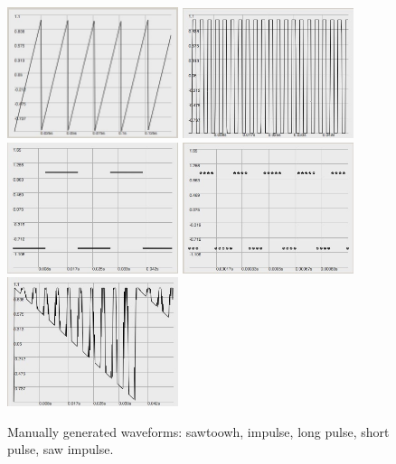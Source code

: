 \documentclass[letterpaper, 12pt]{article}
\begin{document}
\begin{figure}
	\centering
		\includegraphics[width=5cm]{wv-sawtooth}
		\includegraphics[width=5cm]{wv-impulse}
		\includegraphics[width=5cm]{wv-pulse202}
		\includegraphics[width=5cm]{wv-pulse22}
		\includegraphics[width=5cm]{wv-sawImpulse}
	\caption{Manually generated waveforms: sawtoowh, impulse, long pulse, short pulse, saw impulse.}
	\label{fig:fig_waveforms_POPdestroy-random}
\end{figure}



\parskip 18pt
\end{document}

